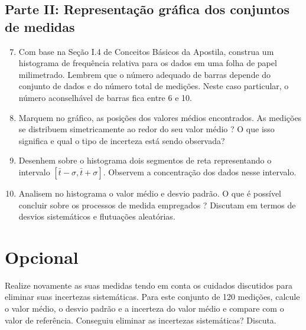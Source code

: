 \subsection*{Parte II:  Representação gráfica dos conjuntos de medidas}

\begin{enumerate}
\setcounter{enumi}{6}

\item Com base na Seção I.4 de Conceitos Básicos da Apostila, construa um histograma de frequência relativa para os dados em uma  folha de papel milimetrado. Lembrem que o número adequado de barras depende do conjunto de dados e do número total de medições. Neste caso particular, o número aconselhável de barras fica entre 6 e 10. 
 
\item Marquem no gráfico, as posições dos valores médios encontrados. As medições se distribuem simetricamente ao redor do seu valor médio ? O que isso significa e qual o tipo de incerteza está sendo observada?

\item Desenhem sobre o histograma dois segmentos de reta representando o intervalo $[\bar t-\sigma, \bar t+\sigma]$. Observem a concentração dos dados nesse intervalo. 

\item Analisem no histograma o valor médio e desvio padrão.  O que é possível concluir sobre os processos de medida empregados ? Discutam em termos de desvios sistemáticos e flutuações aleatórias. 

\end{enumerate}

\vspace{-0.9cm}
\section*{Opcional} 

Realize novamente as suas medidas tendo em conta os cuidados discutidos para eliminar suas incertezas sistemáticas. Para este conjunto de 120 medições, calcule o valor médio, o desvio padrão e a incerteza do valor médio e compare com o valor de referência. Conseguiu eliminar as incertezas sistemáticas?  Discuta. 


  
